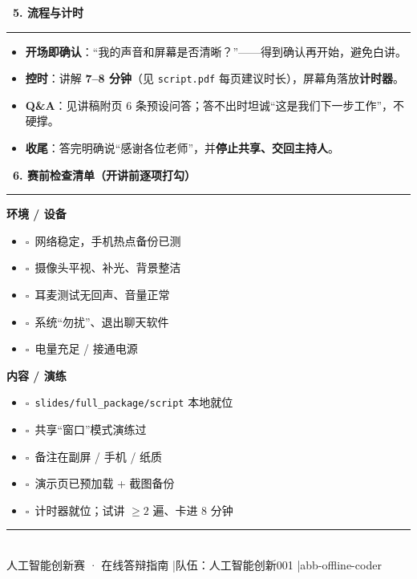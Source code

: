 \documentclass[a4paper,11pt,fontset=none]{ctexart}
\newcommand{\sect}[1]{\par\vspace{7pt}\noindent
  {\sffamily\bfseries\large\color{abbdark}\ding{110}\ #1}\\[-3pt]
  {\color{abbred}\rule{\linewidth}{0.8pt}}\par\vspace{3pt}}
\newcommand{\cb}{$\square$\ }
\begin{document}
\sect{5. 流程与计时}
\begin{itemize}
  \item \textbf{开场即确认}：“我的声音和屏幕是否清晰？”——得到确认再开始，避免白讲。
  \item \textbf{控时}：讲解 \textbf{7--8 分钟}（见 \texttt{script.pdf} 每页建议时长），屏幕角落放\textbf{计时器}。
  \item \textbf{Q\&A}：见讲稿附页 6 条预设问答；答不出时坦诚“这是我们下一步工作”，不硬撑。
  \item \textbf{收尾}：答完明确说“感谢各位老师”，并\textbf{停止共享、交回主持人}。
\end{itemize}

\sect{6. 赛前检查清单（开讲前逐项打勾）}
\begin{minipage}[t]{0.5\linewidth}
\textbf{\color{abbred}环境 / 设备}
\begin{itemize}[label={}]
  \item \cb 网络稳定，手机热点备份已测
  \item \cb 摄像头平视、补光、背景整洁
  \item \cb 耳麦测试无回声、音量正常
  \item \cb 系统“勿扰”、退出聊天软件
  \item \cb 电量充足 / 接通电源
\end{itemize}
\end{minipage}\hfill
\begin{minipage}[t]{0.46\linewidth}
\textbf{\color{abbred}内容 / 演练}
\begin{itemize}[label={}]
  \item \cb \texttt{slides/full\_package/script} 本地就位
  \item \cb 共享“窗口”模式演练过
  \item \cb 备注在副屏 / 手机 / 纸质
  \item \cb 演示页已预加载 + 截图备份
  \item \cb 计时器就位；试讲 $\ge 2$ 遍、卡进 8 分钟
\end{itemize}
\end{minipage}

\vspace{8pt}
\begin{center}{\color{linegray}\rule{0.5\textwidth}{0.6pt}}\\[4pt]
{\sffamily\small\color{abbgray} 人工智能创新赛 · 在线答辩指南 \quad|\quad 队伍：人工智能创新001 \quad|\quad abb-offline-coder}\end{center}
\end{document}

